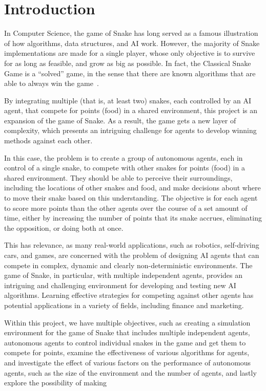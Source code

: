 \graphicspath{ {./img/} }
\section{Introduction}
In Computer Science, the game of Snake has long served as a famous illustration of how algorithms, data structures, and AI
work. However, the majority of Snake implementations are made for a single player, whose only objective is to survive for
as long as feasible, and grow as big as possible.
In fact, the Classical Snake Game is a “solved” game, in the sense that there are known algorithms that are able to
always win the game~\cite{ClassicSnakeGame}.

By integrating multiple (that is, at least two) snakes, each controlled by an AI agent, that compete for
points (food) in a shared environment, this project is an expansion of the game of Snake. As a result, the game gets a new layer
of complexity, which presents an intriguing challenge for agents to develop winning methods against each other.

In this case, the problem is to create a group of autonomous agents, each in control of a single snake, to compete with other
snakes for points (food) in a shared environment. They should be able to perceive their surroundings, including the
locations of other snakes and food, and make decisions about where to move their snake based on this understanding.
The objective is for each agent to score more points than the other agents over the course of a set amount of time, either by
increasing the number of points that its snake accrues, eliminating the opposition, or doing both at once.

This has relevance, as many real-world applications, such as robotics, self-driving cars, and games, are concerned with the
problem of designing AI agents that can compete in complex, dynamic and clearly non-deterministic environments. The game of
Snake, in particular, with multiple independent agents, provides an intriguing and challenging environment for developing and
testing new AI algorithms. Learning effective strategies for competing against other agents has potential applications in a
variety of fields, including finance and marketing.

Within this project, we have multiple objectives, such as creating a simulation environment for the game of Snake that includes
multiple independent agents, autonomous agents to control individual snakes in the game and get them to compete for points,
examine the effectiveness of various algorithms for agents, and investigate the effect of various factors on the performance
of autonomous agents, such as the size of the environment and the number of agents, and lastly explore the possibility of making

